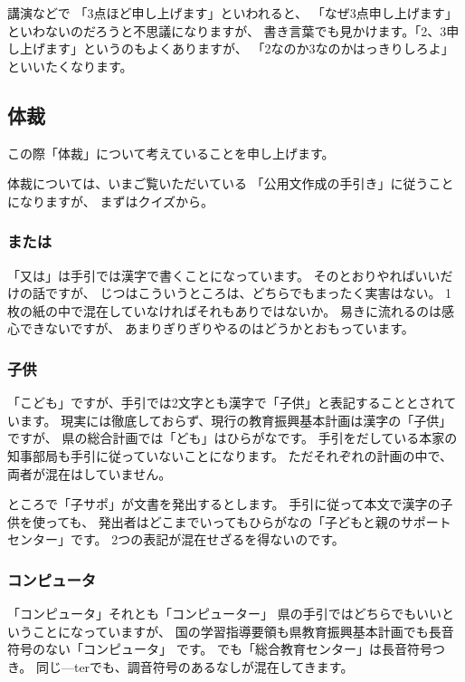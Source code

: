 \documentclass[uplatex,jis2004,dvipdfmx,12pt]{jsarticle}
\begin{document}
講演などで
「3点ほど申し上げます」といわれると、
「なぜ3点申し上げます」といわないのだろうと不思議になりますが、
書き言葉でも見かけます。「2、3申し上げます」というのもよくありますが、
「2なのか3なのかはっきりしろよ」といいたくなります。





\subsection{体裁}

この際「体裁」について考えていることを申し上げます。


体裁については、いまご覧いただいている
「公用文作成の手引き」に従うことになりますが、
まずはクイズから。

\subsubsection{または}
「又は」は手引では漢字で書くことになっています。
そのとおりやればいいだけの話ですが、
じつはこういうところは、どちらでもまったく実害はない。
1枚の紙の中で混在していなければそれもありではないか。
易きに流れるのは感心できないですが、
あまりぎりぎりやるのはどうかとおもっています。

\subsubsection{子供}
「こども」ですが、手引では2文字とも漢字で「子供」と表記することとされています。
現実には徹底しておらず、現行の教育振興基本計画は漢字の「子供」ですが、
県の総合計画では「ども」はひらがなです。
手引をだしている本家の知事部局も手引に従っていないことになります。
ただそれぞれの計画の中で、
両者が混在はしていません。


ところで「子サポ」が文書を発出するとします。
手引に従って本文で漢字の子供を使っても、
発出者はどこまでいってもひらがなの「子どもと親のサポートセンター」です。
2つの表記が混在せざるを得ないのです。

\subsubsection{コンピュータ}
「コンピュータ」それとも「コンピューター」
県の手引ではどちらでもいいということになっていますが、
国の学習指導要領も県教育振興基本計画でも長音符号のない「コンピュータ」
です。
でも「総合教育センター」は長音符号つき。
同じ---terでも、調音符号のあるなしが混在してきます。
\end{document}
